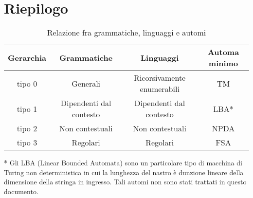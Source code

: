   \section{Riepilogo}

  \begin{table}[ht]
    \caption{Relazione fra grammatiche, linguaggi e automi}
    \centering
    \vspace{10px}
    \begin{tabular}{c c c c}
      Gerarchia & Grammatiche & Linguaggi & Automa minimo \\ 
      \hline
      tipo 0 & Generali & Ricorsivamente enumerabili & TM\\
      tipo 1 & Dipendenti dal contesto & Dipendenti dal contesto & LBA*\\
      tipo 2 & Non contestuali & Non contestuali & NPDA\\
      tipo 3 & Regolari & Regolari & FSA\\
    \end{tabular}
  \end{table}

  * Gli LBA (Linear Bounded Automata) sono un particolare tipo di macchina di Turing non deterministica in cui la lunghezza del nastro è dunzione lineare della dimensione della stringa in ingresso. Tali automi non sono stati trattati in questo documento. 